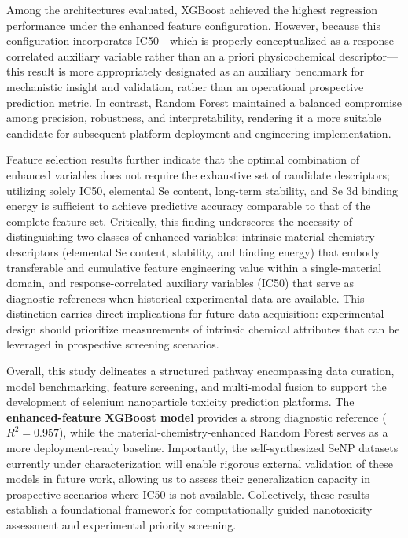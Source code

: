 \documentclass[letterpaper]{article}
\begin{document}
Among the architectures evaluated, XGBoost achieved the highest regression performance under the enhanced feature configuration. However, because this configuration incorporates IC50—which is properly conceptualized as a response-correlated auxiliary variable rather than an a priori physicochemical descriptor—this result is more appropriately designated as an auxiliary benchmark for mechanistic insight and validation, rather than an operational prospective prediction metric. In contrast, Random Forest maintained a balanced compromise among precision, robustness, and interpretability, rendering it a more suitable candidate for subsequent platform deployment and engineering implementation.

Feature selection results further indicate that the optimal combination of enhanced variables does not require the exhaustive set of candidate descriptors; utilizing solely IC50, elemental Se content, long-term stability, and Se 3d binding energy is sufficient to achieve predictive accuracy comparable to that of the complete feature set. Critically, this finding underscores the necessity of distinguishing two classes of enhanced variables: intrinsic material-chemistry descriptors (elemental Se content, stability, and binding energy) that embody transferable and cumulative feature engineering value within a single-material domain, and response-correlated auxiliary variables (IC50) that serve as diagnostic references when historical experimental data are available. This distinction carries direct implications for future data acquisition: experimental design should prioritize measurements of intrinsic chemical attributes that can be leveraged in prospective screening scenarios.

Overall, this study delineates a structured pathway encompassing data curation, model benchmarking, feature screening, and multi-modal fusion to support the development of selenium nanoparticle toxicity prediction platforms. The \textbf{enhanced-feature XGBoost model} provides a strong diagnostic reference ($R^2 = 0.957$), while the material-chemistry-enhanced Random Forest serves as a more deployment-ready baseline. Importantly, the self-synthesized SeNP datasets currently under characterization will enable rigorous external validation of these models in future work, allowing us to assess their generalization capacity in prospective scenarios where IC50 is not available. Collectively, these results establish a foundational framework for computationally guided nanotoxicity assessment and experimental priority screening.
\end{document}
